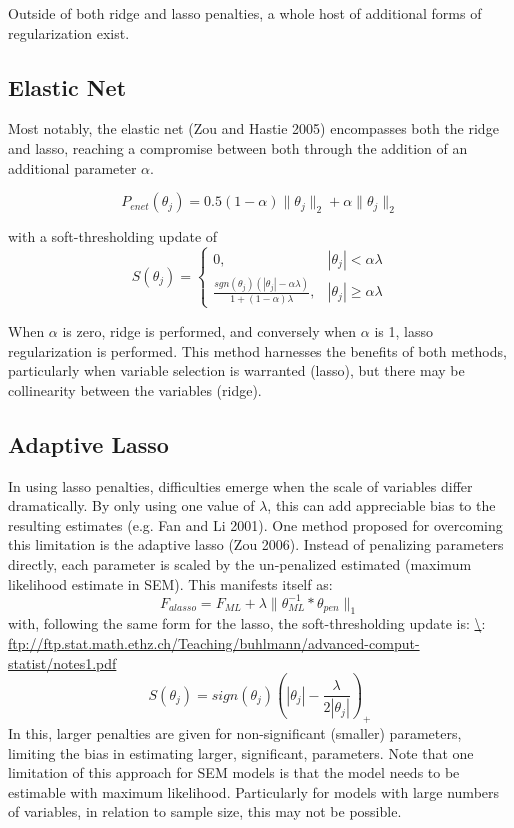 \documentclass[article]{jss}
\begin{document}
Outside of both ridge and lasso penalties, a whole host of additional
forms of regularization exist.

\subsection{Elastic Net}\label{elastic-net}

Most notably, the elastic net (Zou and Hastie 2005) encompasses both the
ridge and lasso, reaching a compromise between both through the addition
of an additional parameter \(\alpha\).

\[
P_{enet}(\theta_{j}) = 0.5(1-\alpha)\| \theta_{j} \|_{2} + \alpha\| \theta_{j} \|_{2}
\]

with a soft-thresholding update of \[
S(\theta_{j})= 
\begin{cases}
0,&  |\theta_{j}| < \alpha\lambda\\
\frac{sgn(\theta_{j})(|\theta_{j}|-\alpha\lambda)}{1+(1-\alpha)\lambda},              & |\theta_{j}|\geq\alpha\lambda
\end{cases}
\]

\noindent
When \(\alpha\) is zero, ridge is performed, and conversely when
\(\alpha\) is 1, lasso regularization is performed. This method
harnesses the benefits of both methods, particularly when variable
selection is warranted (lasso), but there may be collinearity between
the variables (ridge).

\subsection{Adaptive Lasso}\label{adaptive-lasso}

In using lasso penalties, difficulties emerge when the scale of
variables differ dramatically. By only using one value of \(\lambda\),
this can add appreciable bias to the resulting estimates (e.g. Fan and
Li 2001). One method proposed for overcoming this limitation is the
adaptive lasso (Zou 2006). Instead of penalizing parameters directly,
each parameter is scaled by the un-penalized estimated (maximum
likelihood estimate in SEM). This manifests itself as: \[
F_{alasso} = F_{ML} + \lambda \| \theta_{ML}^{-1} * \theta_{pen} \|_{1}
\] \noindent
with, following the same form for the lasso, the soft-thresholding
update is:
\href{High\%20dimensional\%20statistics\%20p.\%2032}{\textbackslash{}}:
\url{ftp://ftp.stat.math.ethz.ch/Teaching/buhlmann/advanced-comput-statist/notes1.pdf}
\[
S(\theta_{j})= sign(\theta_{j})(|\theta_{j}|-\frac{\lambda}{2|\theta_{j}|})_{+}
\] \noindent
In this, larger penalties are given for non-significant (smaller)
parameters, limiting the bias in estimating larger, significant,
parameters. Note that one limitation of this approach for SEM models is
that the model needs to be estimable with maximum likelihood.
Particularly for models with large numbers of variables, in relation to
sample size, this may not be possible.
\end{document}
